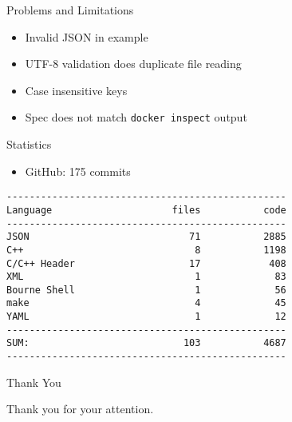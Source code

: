 \documentclass{beamer}
\begin{document}
\begin{frame}{Problems and Limitations}

    \begin{itemize}

        \item Invalid JSON in example

        \item UTF-8 validation does duplicate file reading

        \item Case insensitive keys

        \item Spec does not match \texttt{docker inspect} output

    \end{itemize}

\end{frame}

\begin{frame}[fragile]{Statistics}

\begin{itemize}

    \item GitHub: 175 commits

\end{itemize}

\begin{Verbatim}
-------------------------------------------------
Language                     files           code
-------------------------------------------------
JSON                            71           2885
C++                              8           1198
C/C++ Header                    17            408
XML                              1             83
Bourne Shell                     1             56
make                             4             45
YAML                             1             12
-------------------------------------------------
SUM:                           103           4687
-------------------------------------------------
\end{Verbatim}

\end{frame}

\begin{frame}{Thank You}
    \Huge{\centerline{Thank you for your attention.}}
\end{frame}

\end{document}
